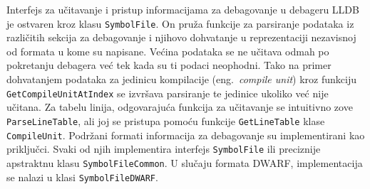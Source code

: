 \documentclass[12pt,oneside]{memoir}
\begin{document}
Interfejs za učitavanje i pristup informacijama za debagovanje u debageru LLDB je ostvaren kroz klasu \verb|SymbolFile|.
On pruža funkcije za parsiranje podataka iz različitih sekcija za debagovanje i njihovo dohvatanje u reprezentaciji nezavisnoj od formata u kome su napisane.
Većina podataka se ne učitava odmah po pokretanju debagera već tek kada su ti podaci neophodni.
Tako na primer dohvatanjem podataka za jedinicu kompilacije (eng.~{\em compile unit}) kroz funkciju \verb|GetCompileUnitAtIndex| se izvršava parsiranje te jedinice ukoliko već nije učitana.
Za tabelu linija, odgovarajuća funkcija za učitavanje se intuitivno zove \verb|ParseLineTable|, ali joj se pristupa pomoću funkcije \verb|GetLineTable| klase \verb|CompileUnit|.
Podržani formati informacija za debagovanje su implementirani kao priključci.
Svaki od njih implementira interfejs \verb|SymbolFile| ili preciznije apstraktnu klasu \verb|SymbolFileCommon|.
U slučaju formata DWARF, implementacija se nalazi u klasi \verb|SymbolFileDWARF|.

\end{document}
